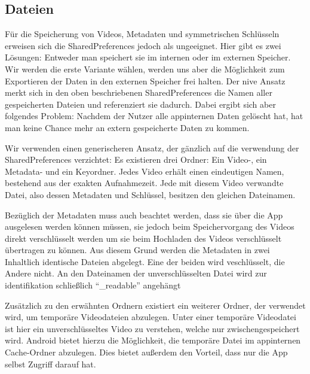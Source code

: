 \subsection{Dateien}
Für die Speicherung von Videos, Metadaten und symmetrischen Schlüsseln erweisen sich die SharedPreferences jedoch als ungeeignet. Hier gibt es zwei Lösungen: Entweder man speichert sie im internen oder im externen Speicher. Wir werden die erste Variante wählen, werden uns aber die Möglichkeit zum Exportieren der Daten in den externen Speicher frei halten. Der nive Ansatz merkt sich in den oben beschriebenen SharedPreferences die Namen aller gespeicherten Dateien und referenziert sie dadurch. Dabei ergibt sich aber folgendes Problem: Nachdem der Nutzer alle appinternen Daten gelöscht hat, hat man keine Chance mehr an extern gespeicherte Daten zu kommen. \newline\par
Wir verwenden einen generischeren Ansatz, der gänzlich auf die verwendung der SharedPreferences verzichtet: Es existieren drei Ordner: Ein Video-, ein Metadata- und ein Keyordner. Jedes Video erhält einen eindeutigen Namen, bestehend aus der exakten Aufnahmezeit. Jede mit diesem Video verwandte Datei, also dessen Metadaten und Schlüssel, besitzen den gleichen Dateinamen.\newline\par

Bezüglich der Metadaten muss auch beachtet werden, dass sie über die App ausgelesen werden können müssen, sie jedoch beim Speichervorgang des Videos direkt verschlüsselt werden um sie beim Hochladen des Videos verschlüsselt übertragen zu können. Aus diesem Grund werden die Metadaten in zwei Inhaltlich identische Dateien abgelegt. Eine der beiden wird veschlüsselt, die Andere nicht. An den Dateinamen der unverschlüsselten Datei wird zur identifikation schließlich ``\_readable'' angehängt\newline\par

Zusätzlich zu den erwähnten Ordnern existiert ein weiterer Ordner, der verwendet wird, um temporäre Videodateien abzulegen. Unter einer temporäre Videodatei ist hier ein unverschlüsseltes Video zu verstehen, welche nur zwischengespeichert wird. Android bietet hierzu die Möglichkeit, die temporäre Datei im appinternen Cache-Ordner abzulegen. Dies bietet außerdem den Vorteil, dass nur die App selbst Zugriff darauf hat.

